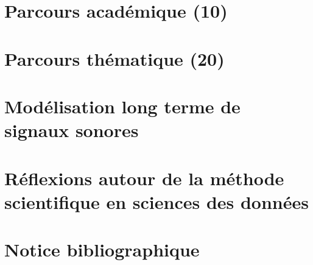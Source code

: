 \documentclass[a4paper, french, 10pt]{tufte-book}
\begin{document}
  \chapter{Parcours académique (10)}

  

  \chapter{Parcours thématique (20)}

  

  \chapter{Modélisation long terme de signaux sonores}

  

  \chapter{Réflexions autour de la méthode scientifique en sciences des données}

  


  

  \chapter{Notice bibliographique}

  

  
\end{document}
